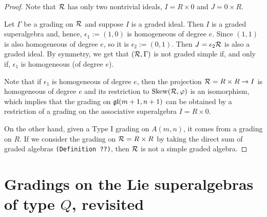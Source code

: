 \begin{proof}
    Note that $\mathcal R$ has only two nontrivial ideals, $I = R\times 0$ and $J = 0\times R$.
    
    Let $\Gamma$ be a grading on $\mathcal R$ and suppose $I$ is a graded ideal. Then $I$ is a graded superalgebra and, hence, $\epsilon_1 := (1,0)$ is homogeneous of degree $e$. Since $(1,1)$ is also homogeneous of degree $e$, so it is $\epsilon_2:= (0,1)$. Then $J = \epsilon_2 \mathcal R$ is also a graded ideal. By symmetry, we get that $(\mathcal R, \Gamma)$ is not graded simple if, and only if, $\epsilon_1$ is homogeneous (of degree $e$).
    
    Note that if $\epsilon_1$ is homogeneous of degree $e$, then the projection $\mathcal R = R\times R \to I$ is homogeneous of degree $e$ and its restriction to $\operatorname{Skew}(\mathcal R, \varphi)$ is an isomorphism, which implies that the grading on $\mathfrak{gl}(m +1, n+1)$ can be obtained by a restriction of a grading on the associative superalgebra $I = R\times 0$.
    
    On the other hand, given a Type I grading on $A(m,n)$, it comes from a grading on $R$. If we consider the grading on $\mathcal R = R\times R$ by taking the direct sum of graded algebras {\tt (Definition ??)}, then $\mathcal R$ is not a simple graded algebra.
\end{proof}

\section{Gradings on the Lie superalgebras of type $Q$, revisited}
